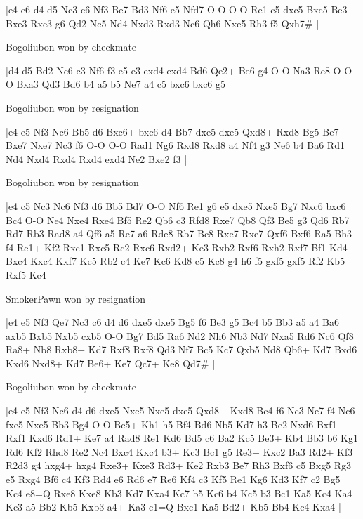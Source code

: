 \makegametitle
|e4 e6 d4 d5 Nc3 c6 Nf3 Be7 Bd3 Nf6 e5 Nfd7 O-O O-O Re1 c5 dxc5 Bxc5 Be3 Bxe3 Rxe3 g6 Qd2 Nc5 Nd4 Nxd3 Rxd3 Nc6 Qh6 Nxe5 Rh3 f5 Qxh7\#  |

\showboard

Bogoliubon won by checkmate

\makegametitle
|d4 d5 Bd2 Nc6 c3 Nf6 f3 e5 e3 exd4 exd4 Bd6 Qe2+ Be6 g4 O-O Na3 Re8 O-O-O Bxa3 Qd3 Bd6 b4 a5 b5 Ne7 a4 c5 bxc6 bxc6 g5  |

\showboard

Bogoliubon won by resignation

\makegametitle
|e4 e5 Nf3 Nc6 Bb5 d6 Bxc6+ bxc6 d4 Bb7 dxe5 dxe5 Qxd8+ Rxd8 Bg5 Be7 Bxe7 Nxe7 Nc3 f6 O-O O-O Rad1 Ng6 Rxd8 Rxd8 a4 Nf4 g3 Ne6 b4 Ba6 Rd1 Nd4 Nxd4 Rxd4 Rxd4 exd4 Ne2 Bxe2 f3  |

\showboard

Bogoliubon won by resignation

\makegametitle
|e4 c5 Nc3 Nc6 Nf3 d6 Bb5 Bd7 O-O Nf6 Re1 g6 e5 dxe5 Nxe5 Bg7 Nxc6 bxc6 Bc4 O-O Ne4 Nxe4 Rxe4 Bf5 Re2 Qb6 c3 Rfd8 Rxe7 Qb8 Qf3 Be5 g3 Qd6 Rb7 Rd7 Rb3 Rad8 a4 Qf6 a5 Re7 a6 Rde8 Rb7 Bc8 Rxe7 Rxe7 Qxf6 Bxf6 Ra5 Bh3 f4 Re1+ Kf2 Rxc1 Rxc5 Rc2 Rxc6 Rxd2+ Ke3 Rxb2 Rxf6 Rxh2 Rxf7 Bf1 Kd4 Bxc4 Kxc4 Kxf7 Kc5 Rb2 c4 Ke7 Kc6 Kd8 c5 Kc8 g4 h6 f5 gxf5 gxf5 Rf2 Kb5 Rxf5 Kc4  |

\showboard

SmokerPawn won by resignation

\makegametitle
|e4 e5 Nf3 Qe7 Nc3 c6 d4 d6 dxe5 dxe5 Bg5 f6 Be3 g5 Bc4 b5 Bb3 a5 a4 Ba6 axb5 Bxb5 Nxb5 cxb5 O-O Bg7 Bd5 Ra6 Nd2 Nh6 Nb3 Nd7 Nxa5 Rd6 Nc6 Qf8 Ra8+ Nb8 Rxb8+ Kd7 Rxf8 Rxf8 Qd3 Nf7 Bc5 Kc7 Qxb5 Nd8 Qb6+ Kd7 Bxd6 Kxd6 Nxd8+ Kd7 Be6+ Ke7 Qc7+ Ke8 Qd7\#  |

\showboard

Bogoliubon won by checkmate

\makegametitle
|e4 e5 Nf3 Nc6 d4 d6 dxe5 Nxe5 Nxe5 dxe5 Qxd8+ Kxd8 Bc4 f6 Nc3 Ne7 f4 Nc6 fxe5 Nxe5 Bb3 Bg4 O-O Bc5+ Kh1 h5 Bf4 Bd6 Nb5 Kd7 h3 Be2 Nxd6 Bxf1 Rxf1 Kxd6 Rd1+ Ke7 a4 Rad8 Re1 Kd6 Bd5 c6 Ba2 Kc5 Be3+ Kb4 Bb3 b6 Kg1 Rd6 Kf2 Rhd8 Re2 Nc4 Bxc4 Kxc4 b3+ Kc3 Bc1 g5 Re3+ Kxc2 Ba3 Rd2+ Kf3 R2d3 g4 hxg4+ hxg4 Rxe3+ Kxe3 Rd3+ Ke2 Rxb3 Be7 Rh3 Bxf6 c5 Bxg5 Rg3 e5 Rxg4 Bf6 c4 Kf3 Rd4 e6 Rd6 e7 Re6 Kf4 c3 Kf5 Re1 Kg6 Kd3 Kf7 c2 Bg5 Kc4 e8=Q Rxe8 Kxe8 Kb3 Kd7 Kxa4 Kc7 b5 Kc6 b4 Kc5 b3 Bc1 Ka5 Kc4 Ka4 Kc3 a5 Bb2 Kb5 Kxb3 a4+ Ka3 c1=Q Bxc1 Ka5 Bd2+ Kb5 Bb4 Kc4 Kxa4  |

